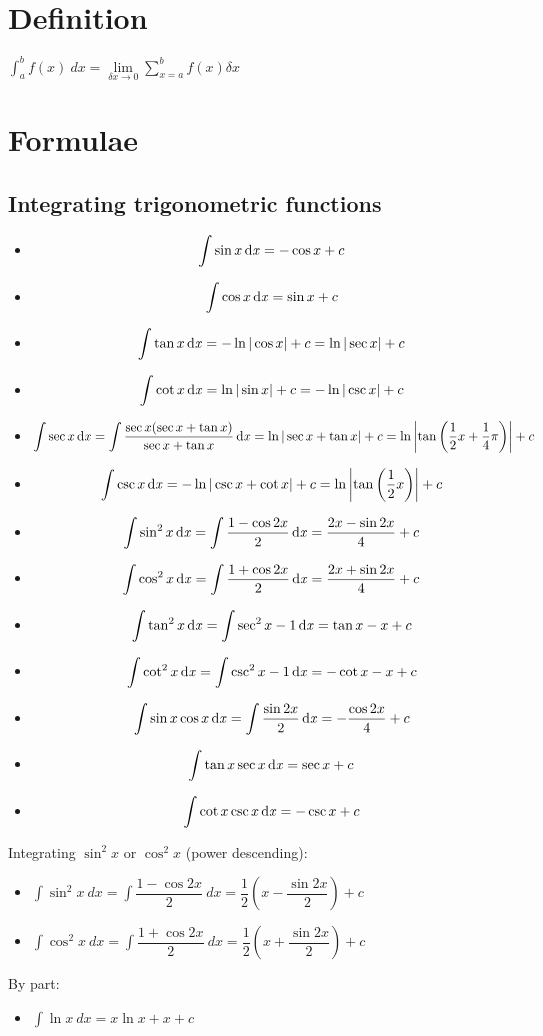\section{Definition}
$\int_{a}^{b} f(x) \: dx = \lim\limits_{\delta x\rightarrow0}\sum_{x=a}^{b}f(x)\delta x$

\section{Formulae}
\subsection{Integrating trigonometric functions}
\begin{itemize}
    \item \[\int\sin x \operatorname{\mathrm{d}\mathit{x}} = -\cos x + c\]
    \item \[\int\cos x \operatorname{\mathrm{d}\mathit{x}} = \sin x + c\]
    \item \[\int \tan x \operatorname{\mathrm{d}\mathit{x}} = -\ln |\cos x| + c= \ln |\sec x| + c\]
    \item \[\int \cot x \operatorname{\mathrm{d}\mathit{x}} = \ln |\sin x| + c = -\ln |\csc x| + c\]
    \item \[\int \sec x \operatorname{\mathrm{d}\mathit{x}} = \int \frac{\sec x(\sec x + \tan x)}{\sec x + \tan x} \operatorname{\mathrm{d}\mathit{x}} = \ln |\sec x + \tan x| + c = \ln \left|\tan\left(\frac{1}{2}x+\frac{1}{4}\pi \right)\right| + c\]
    \item \[\int \csc x \operatorname{\mathrm{d}\mathit{x}} = -\ln|\csc x + \cot x| + c = \ln \left|\tan\left(\frac{1}{2}x\right)\right| + c\]
    \item \[\int \sin^2 x \operatorname{\mathrm{d}\mathit{x}} = \int \frac{1-\cos 2x}{2} \operatorname{\mathrm{d}\mathit{x}} = \frac{2x-\sin 2x}{4} + c\]
    \item \[\int \cos^2 x \operatorname{\mathrm{d}\mathit{x}} = \int \frac{1+\cos 2x}{2} \operatorname{\mathrm{d}\mathit{x}} = \frac{2x+\sin 2x}{4} + c\]
    \item \[\int \tan^2 x \operatorname{\mathrm{d}\mathit{x}} = \int \sec^2 x -1 \operatorname{\mathrm{d}\mathit{x}} = \tan x - x + c\]
    \item \[\int \cot^2 x \operatorname{\mathrm{d}\mathit{x}} = \int \csc^2 x -1 \operatorname{\mathrm{d}\mathit{x}} = -\cot x - x + c\]
    \item \[\int \sin x \cos x \operatorname{\mathrm{d}\mathit{x}} = \int \frac{\sin 2x}{2} \operatorname{\mathrm{d}\mathit{x}} = -\dfrac{\cos 2x}{4} + c\]
    \item \[\int \tan x \sec x \operatorname{\mathrm{d}\mathit{x}} = \sec x + c\]
    \item \[\int \cot x \csc x \operatorname{\mathrm{d}\mathit{x}} = -\csc x + c\]
\end{itemize}
Integrating $\sin^2x$ or $\cos^2x$ (power descending):
\begin{itemize}
    \item $\int \sin ^2 x \: dx=\int \dfrac{1-\cos 2x}{2} \: dx=\dfrac{1}{2}\left(x-\dfrac{\sin 2x}{2}\right)+c$
    \item $\int \cos ^2 x \: dx=\int \dfrac{1+\cos 2x}{2} \: dx= \dfrac{1}{2}\left(x+\dfrac{\sin 2x}{2}\right)+c$
\end{itemize}
By part:
\begin{itemize}
    \item $\int \ln x \: dx = x\ln x + x + c$
\end{itemize}
